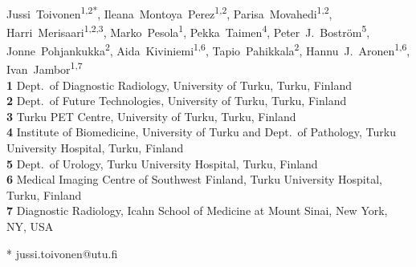\documentclass[10pt,letterpaper]{article}
\newcommand{\turku}{Turku, Finland}
\newcommand{\utu}{University of Turku}
\newcommand{\tyks}{Turku University Hospital}
\newcommand{\deptdr}{Dept.\ of Diagnostic Radiology}
\newcommand{\deptft}{Dept.\ of Future Technologies}
\begin{document}
\vspace*{0.2in}

\begin{flushleft}
{\Large
\textbf{}
}
\newline
\\
Jussi~Toivonen\textsuperscript{1,2*},
Ileana~Montoya~Perez\textsuperscript{1,2},
Parisa~Movahedi\textsuperscript{1,2},
Harri~Merisaari\textsuperscript{1,2,3},
Marko~Pesola\textsuperscript{1},
Pekka~Taimen\textsuperscript{4},
Peter~J.~Boström\textsuperscript{5},
Jonne~Pohjankukka\textsuperscript{2},
Aida~Kiviniemi\textsuperscript{1,6},
Tapio~Pahikkala\textsuperscript{2},
Hannu~J.~Aronen\textsuperscript{1,6},
Ivan~Jambor\textsuperscript{1,7}
\\
\bigskip
\textbf{1} \deptdr, \utu, \turku\\
\textbf{2} \deptft, \utu, \turku\\
\textbf{3} Turku PET Centre, \utu, \turku\\
\textbf{4} Institute of Biomedicine, \utu{} and
    Dept.\ of Pathology, \tyks, \turku\\
\textbf{5} Dept.\ of Urology, \tyks, \turku\\
\textbf{6} Medical Imaging Centre of Southwest Finland, \tyks, \turku\\
\textbf{7} Diagnostic Radiology, Icahn School of Medicine at Mount Sinai, New
    York, NY, USA\\
\bigskip

%


* jussi.toivonen@utu.fi

\end{flushleft}
\end{document}
